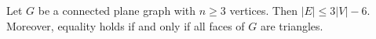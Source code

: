 

\setcounter{section}{3}
\setcounter{subsection}{2}
\setcounter{dfn}{8}

\begin{thm}
\label{thm:3V-6}
Let $G$ be a connected plane graph with $n \ge 3$ vertices.
Then $|E| \le 3|V| - 6$.
Moreover, equality holds if and only if all faces of $G$ are triangles.
\end{thm}


